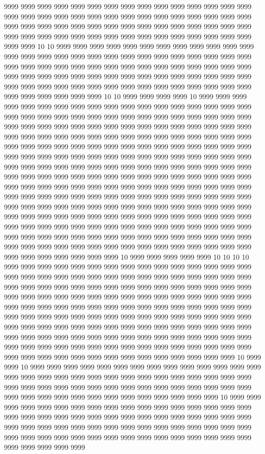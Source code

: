 9999 9999 9999 9999 9999 9999 9999 9999 9999 9999 9999 9999 9999 9999 9999 9999 9999 9999 9999 9999 9999 9999 9999 9999 9999 9999 9999 9999 9999 9999 9999 9999 9999 9999 9999 9999 9999 9999 9999 9999 9999 9999 9999 9999 9999 9999 9999 9999 9999 9999 9999 9999 9999 9999 9999 9999 9999 9999 9999 9999 9999 9999 10 10 9999 9999 9999 9999 9999 9999 9999 9999 9999 9999 9999 9999 9999 9999 9999 9999 9999 9999 9999 9999 9999 9999 9999 9999 9999 9999 9999 9999 9999 9999 9999 9999 9999 9999 9999 9999 9999 9999 9999 9999 9999 9999 9999 9999 9999 9999 9999 9999 9999 9999 9999 9999 9999 9999 9999 9999 9999 9999 9999 9999 9999 9999 9999 9999 9999 9999 9999 9999 9999 9999 9999 9999 9999 9999 9999 9999 9999 9999 10 10 9999 9999 9999 9999 10 9999 9999 9999 9999 9999 9999 9999 9999 9999 9999 9999 9999 9999 9999 9999 9999 9999 9999 9999 9999 9999 9999 9999 9999 9999 9999 9999 9999 9999 9999 9999 9999 9999 9999 9999 9999 9999 9999 9999 9999 9999 9999 9999 9999 9999 9999 9999 9999 9999 9999 9999 9999 9999 9999 9999 9999 9999 9999 9999 9999 9999 9999 9999 9999 9999 9999 9999 9999 9999 9999 9999 9999 9999 9999 9999 9999 9999 9999 9999 9999 9999 9999 9999 9999 9999 9999 9999 9999 9999 9999 9999 9999 9999 9999 9999 9999 9999 9999 9999 9999 9999 9999 9999 9999 9999 9999 9999 9999 9999 9999 9999 9999 9999 9999 9999 9999 9999 9999 9999 9999 9999 9999 9999 9999 9999 9999 9999 9999 9999 9999 9999 9999 9999 9999 9999 9999 9999 9999 9999 9999 9999 9999 9999 9999 9999 9999 9999 9999 9999 9999 9999 9999 9999 9999 9999 9999 9999 9999 9999 9999 9999 9999 9999 9999 9999 9999 9999 9999 9999 9999 9999 9999 9999 9999 9999 9999 9999 9999 9999 9999 9999 9999 9999 9999 9999 9999 9999 9999 9999 9999 9999 9999 9999 9999 9999 9999 9999 9999 9999 9999 9999 9999 9999 9999 9999 9999 9999 9999 9999 9999 9999 9999 9999 9999 9999 9999 9999 9999 9999 9999 9999 9999 9999 9999 9999 9999 9999 9999 9999 9999 9999 9999 9999 9999 9999 10 9999 9999 9999 9999 9999 10 10 10 10 9999 9999 9999 9999 9999 9999 9999 9999 9999 9999 9999 9999 9999 9999 9999 9999 9999 9999 9999 9999 9999 9999 9999 9999 9999 9999 9999 9999 9999 9999 9999 9999 9999 9999 9999 9999 9999 9999 9999 9999 9999 9999 9999 9999 9999 9999 9999 9999 9999 9999 9999 9999 9999 9999 9999 9999 9999 9999 9999 9999 9999 9999 9999 9999 9999 9999 9999 9999 9999 9999 9999 9999 9999 9999 9999 9999 9999 9999 9999 9999 9999 9999 9999 9999 9999 9999 9999 9999 9999 9999 9999 9999 9999 9999 9999 9999 9999 9999 9999 9999 9999 9999 9999 9999 9999 9999 9999 9999 9999 9999 9999 9999 9999 9999 9999 9999 9999 9999 9999 9999 9999 9999 9999 9999 9999 9999 9999 9999 9999 9999 9999 9999 9999 9999 9999 9999 9999 9999 9999 9999 9999 9999 9999 9999 9999 9999 9999 9999 9999 10 9999 9999 10 9999 9999 9999 9999 9999 9999 9999 9999 9999 9999 9999 9999 9999 9999 9999 9999 9999 9999 9999 9999 9999 9999 9999 9999 9999 9999 9999 9999 9999 9999 9999 9999 9999 9999 9999 9999 9999 9999 9999 9999 9999 9999 9999 9999 9999 9999 9999 9999 9999 9999 9999 9999 9999 9999 9999 9999 9999 10 9999 9999 9999 9999 9999 9999 9999 9999 9999 9999 9999 9999 9999 9999 9999 9999 9999 9999 9999 9999 9999 9999 9999 9999 9999 9999 9999 9999 9999 9999 9999 9999 9999 9999 9999 9999 9999 9999 9999 9999 9999 9999 9999 9999 9999 9999 9999 9999 9999 9999 9999 9999 9999 9999 9999 9999 9999 9999 9999 9999 9999 9999 9999 9999 9999 9999 9999 
